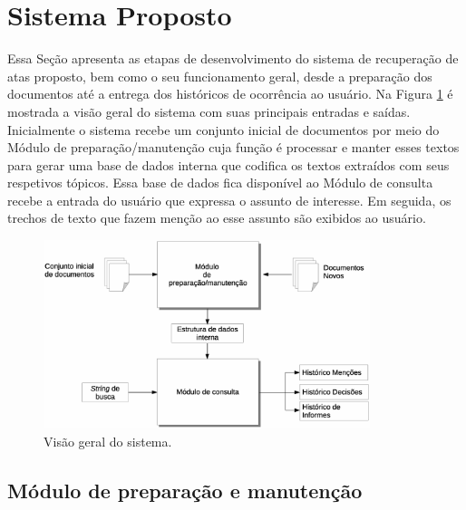 \section{Sistema Proposto}
\label{sec:sistema-proposto}

Essa Seção apresenta as etapas de desenvolvimento do sistema de recuperação de atas proposto, bem como o seu funcionamento geral, desde a preparação dos documentos até a entrega dos históricos de ocorrência ao usuário. 
Na Figura \ref{fig:visao-geral} é mostrada a visão geral do sistema com suas principais entradas e saídas. Inicialmente o sistema recebe um conjunto inicial de documentos por meio do Módulo de preparação/manutenção cuja função é processar e manter esses textos para gerar uma base de dados interna que codifica os textos extraídos com seus respetivos tópicos. Essa base de dados fica disponível ao Módulo de consulta recebe a entrada do usuário que expressa o assunto de interesse. Em seguida, os trechos de texto que fazem menção ao esse assunto são exibidos ao usuário.


  \begin{figure}[!h]
	  \centering
	  \includegraphics[width=0.85\textwidth]{conteudo/capitulos/figs/visao-geral-3.eps}
	  \caption{Visão geral do sistema.}
	  \label{fig:visao-geral}
  \end{figure}









\subsection{Módulo de preparação e manutenção}\label{sec:modulo-preparacao}

